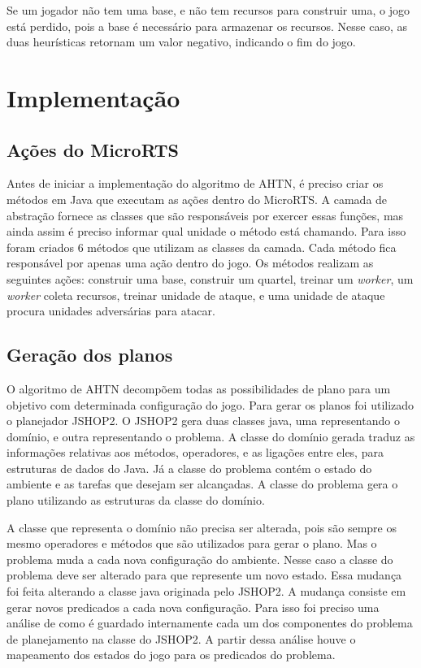 Se um jogador não tem uma base, e não tem recursos para construir uma, o jogo está perdido, pois a base é necessário para armazenar os recursos. 
Nesse caso, as duas heurísticas retornam um valor negativo, indicando o fim do jogo. 

\section{Implementação}

\subsection{Ações do MicroRTS}

Antes de iniciar a implementação do algoritmo de AHTN, é preciso criar os métodos em Java que executam as ações dentro do MicroRTS.
A camada de abstração fornece as classes que são responsáveis por exercer essas funções, mas ainda assim é preciso informar qual unidade o método está chamando.
Para isso foram criados 6 métodos que utilizam as classes da camada.
Cada método fica responsável por apenas uma ação dentro do jogo.
Os métodos realizam as seguintes ações: construir uma base, construir um quartel, treinar um \textit{worker}, um \textit{worker} coleta recursos, treinar unidade de ataque, e uma unidade de ataque procura unidades adversárias para atacar.

\subsection{Geração dos planos}

O algoritmo de AHTN decompõem todas as possibilidades de plano para um objetivo com determinada configuração do jogo.
Para gerar os planos foi utilizado o planejador JSHOP2.
O JSHOP2 gera duas classes java, uma representando o domínio, e outra representando o problema.
A classe do domínio gerada traduz as informações relativas aos métodos, operadores, e as ligações entre eles, para estruturas de dados do Java.
Já a classe do problema contém o estado do ambiente e as tarefas que desejam ser alcançadas.
A classe do problema gera o plano utilizando as estruturas da classe do domínio.

A classe que representa o domínio não precisa ser alterada, pois são sempre os mesmo operadores e métodos que são utilizados para gerar o plano.
Mas o problema muda a cada nova configuração do ambiente.
Nesse caso a classe do problema deve ser alterado para que represente um novo estado.
Essa mudança foi feita alterando a classe java originada pelo JSHOP2. 
A mudança consiste em gerar novos predicados a cada nova configuração.
Para isso foi preciso uma análise de como é guardado internamente cada um dos componentes do problema de planejamento na classe do JSHOP2.
A partir dessa análise houve o mapeamento dos estados do jogo para os predicados do problema.

